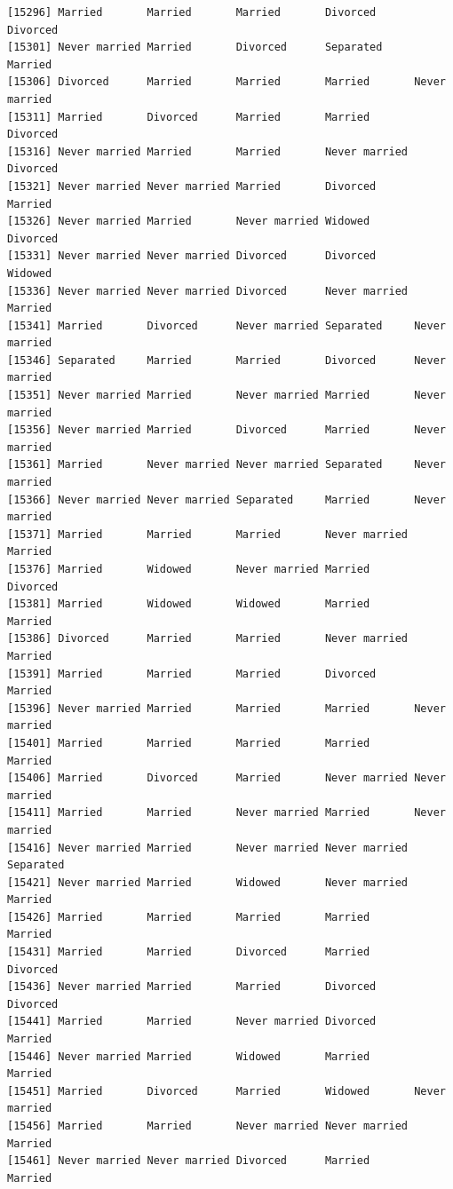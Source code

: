 \documentclass[
  letterpaper,
  DIV=11,
  numbers=noendperiod,
  oneside]{scrartcl}
\begin{document}
\begin{verbatim}
[15296] Married       Married       Married       Divorced      Divorced     
[15301] Never married Married       Divorced      Separated     Married      
[15306] Divorced      Married       Married       Married       Never married
[15311] Married       Divorced      Married       Married       Divorced     
[15316] Never married Married       Married       Never married Divorced     
[15321] Never married Never married Married       Divorced      Married      
[15326] Never married Married       Never married Widowed       Divorced     
[15331] Never married Never married Divorced      Divorced      Widowed      
[15336] Never married Never married Divorced      Never married Married      
[15341] Married       Divorced      Never married Separated     Never married
[15346] Separated     Married       Married       Divorced      Never married
[15351] Never married Married       Never married Married       Never married
[15356] Never married Married       Divorced      Married       Never married
[15361] Married       Never married Never married Separated     Never married
[15366] Never married Never married Separated     Married       Never married
[15371] Married       Married       Married       Never married Married      
[15376] Married       Widowed       Never married Married       Divorced     
[15381] Married       Widowed       Widowed       Married       Married      
[15386] Divorced      Married       Married       Never married Married      
[15391] Married       Married       Married       Divorced      Married      
[15396] Never married Married       Married       Married       Never married
[15401] Married       Married       Married       Married       Married      
[15406] Married       Divorced      Married       Never married Never married
[15411] Married       Married       Never married Married       Never married
[15416] Never married Married       Never married Never married Separated    
[15421] Never married Married       Widowed       Never married Married      
[15426] Married       Married       Married       Married       Married      
[15431] Married       Married       Divorced      Married       Divorced     
[15436] Never married Married       Married       Divorced      Divorced     
[15441] Married       Married       Never married Divorced      Married      
[15446] Never married Married       Widowed       Married       Married      
[15451] Married       Divorced      Married       Widowed       Never married
[15456] Married       Married       Never married Never married Married      
[15461] Never married Never married Divorced      Married       Married      

\end{verbatim}
\end{document}
